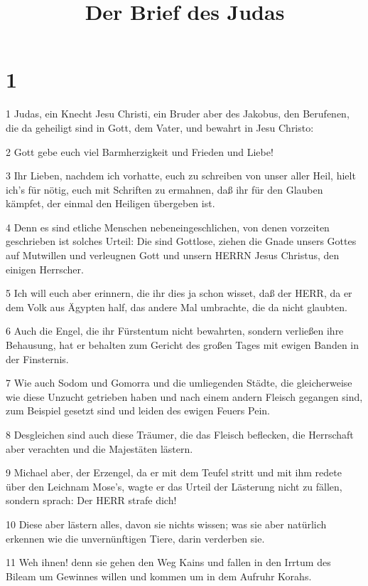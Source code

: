 

\title{Der Brief des Judas}


\chapter{1}

\par 1 Judas, ein Knecht Jesu Christi, ein Bruder aber des Jakobus, den Berufenen, die da geheiligt sind in Gott, dem Vater, und bewahrt in Jesu Christo:
\par 2 Gott gebe euch viel Barmherzigkeit und Frieden und Liebe!
\par 3 Ihr Lieben, nachdem ich vorhatte, euch zu schreiben von unser aller Heil, hielt ich's für nötig, euch mit Schriften zu ermahnen, daß ihr für den Glauben kämpfet, der einmal den Heiligen übergeben ist.
\par 4 Denn es sind etliche Menschen nebeneingeschlichen, von denen vorzeiten geschrieben ist solches Urteil: Die sind Gottlose, ziehen die Gnade unsers Gottes auf Mutwillen und verleugnen Gott und unsern HERRN Jesus Christus, den einigen Herrscher.
\par 5 Ich will euch aber erinnern, die ihr dies ja schon wisset, daß der HERR, da er dem Volk aus Ägypten half, das andere Mal umbrachte, die da nicht glaubten.
\par 6 Auch die Engel, die ihr Fürstentum nicht bewahrten, sondern verließen ihre Behausung, hat er behalten zum Gericht des großen Tages mit ewigen Banden in der Finsternis.
\par 7 Wie auch Sodom und Gomorra und die umliegenden Städte, die gleicherweise wie diese Unzucht getrieben haben und nach einem andern Fleisch gegangen sind, zum Beispiel gesetzt sind und leiden des ewigen Feuers Pein.
\par 8 Desgleichen sind auch diese Träumer, die das Fleisch beflecken, die Herrschaft aber verachten und die Majestäten lästern.
\par 9 Michael aber, der Erzengel, da er mit dem Teufel stritt und mit ihm redete über den Leichnam Mose's, wagte er das Urteil der Lästerung nicht zu fällen, sondern sprach: Der HERR strafe dich!
\par 10 Diese aber lästern alles, davon sie nichts wissen; was sie aber natürlich erkennen wie die unvernünftigen Tiere, darin verderben sie.
\par 11 Weh ihnen! denn sie gehen den Weg Kains und fallen in den Irrtum des Bileam um Gewinnes willen und kommen um in dem Aufruhr Korahs.
